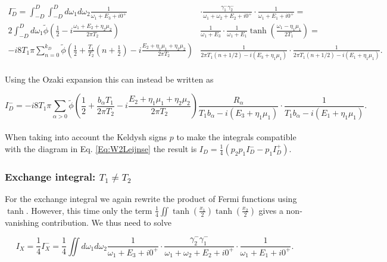 \documentclass{article}
\begin{document}
\begin{equation}
\begin{split}
    I_D^- = \int_{-D}^D\int_{-D}^Dd\omega_1d\omega_2 \frac{1}{\omega_1+E_3+ i0^+}&\cdot\frac{\gamma^{-}_1\gamma^{-}_2}{\omega_1 + \omega_2 + E_2 + i0^+}\cdot\frac{1}{\omega_1+E_1+i0^+} = \\ 
    2\int_{-D}^Dd\omega_1\tilde{\phi}\left( \frac{1}{2}-i\frac{\omega_1+E_2+\eta_2\mu_2}{2\pi T_2}\right)&\frac{1}{\omega_1+E_3}\cdot\frac{1}{\omega_1 + E_1}\tanh\left ( \frac{\omega_1-\eta_1\mu_1}{2T_1}\right ) = \\ 
    -i8 T_1\pi \sum_{n=0}^{k_D}\tilde{\phi}\left ( \frac{1}{2} + \frac{T_1}{T_2}\left(n + \frac{1}{2} \right )-i\frac{E_2 + \eta_1\mu_1 + \eta_2\mu_2}{2\pi T_2} \right )&\frac{1}{2\pi T_1(n + 1/2)-i(E_3+\eta_1\mu_1)}\cdot\frac{1}{2\pi T_1(n+1/2)-i(E_1+\eta_1\mu_1)}.
\end{split}
\end{equation}
\\
Using the Ozaki expansion this can instead be written as 

\begin{equation}
    I_D^- = -i8T_1\pi \sum_{\alpha>0}\tilde{\phi}\left ( \frac{1}{2}+\frac{b_\alpha T_1}{2\pi T_2} -i\frac{E_2+\eta_1\mu_1+\eta_2\mu_2}{2\pi T_2} \right )\frac{R_\alpha}{T_1b_\alpha-i(E_3+\eta_1\mu_1)}\cdot\frac{1}{T_1b_\alpha-i(E_1+\eta_1\mu_1)}.
\end{equation}
\\
When taking into account the Keldysh signs $p$ to make the integrals compatible with the diagram in Eq. \ref{Eq:W2Leijnse} the result is $I_D = \frac{1}{4}(p_2p_1I_D^--p_1I_D^+)$.
\subsubsection{Exchange integral: $T_1\ne T_2$}

For the exchange integral we again rewrite the product of Fermi functions using $\tanh$. However, this time only the term $\frac{1}{4}\iint \tanh\left(\frac{x_1}{2}\right)\tanh\left(\frac{x_2}{2}\right)$ gives a non-vanishing contribution. We thus need to solve

\begin{equation}
    I_X =\frac{1}{4}I_X^- = \frac{1}{4}\iint d\omega_1d\omega_2\frac{1}{\omega_1 + E_3 + i0^+}\cdot\frac{\gamma^-_2\gamma^-_1}{\omega_1 + \omega_2 + E_2 + i0^+}\cdot\frac{1}{\omega_1+E_1+i0^+}.
\end{equation}
\end{document}
